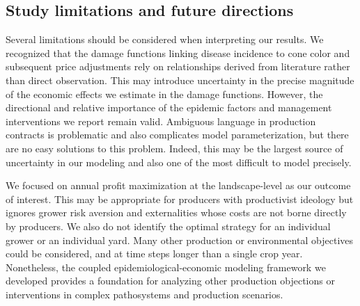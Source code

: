 \documentclass[10pt,a4paper]{article}
\begin{document}
\subsection{Study limitations and future directions}

Several limitations should be considered when interpreting our results. We recognized that the damage functions linking disease incidence to cone color and subsequent price adjustments rely on relationships derived from literature rather than direct observation. This may introduce uncertainty in the precise magnitude of the economic effects we estimate in the damage functions. However, the directional and relative importance of the epidemic factors and management interventions we report remain valid. Ambiguous language in production contracts is problematic and also complicates model parameterization, but there are no easy solutions to this problem. Indeed, this may be the largest source of uncertainty in our modeling and also one of the most difficult to model precisely.

We focused on annual profit maximization at the landscape-level as our outcome of interest. This may be appropriate for producers with productivist ideology \parencite{Mcdowell2018} but ignores grower risk aversion and externalities whose costs are not borne directly by producers. We also do not identify the optimal strategy for an individual grower or an individual yard. Many other production or environmental objectives could be considered, and at time steps longer than a single crop year. Nonetheless, the coupled epidemiological-economic modeling framework we developed provides a foundation for analyzing other production objections or interventions in complex pathosystems and production scenarios.  
\end{document}
